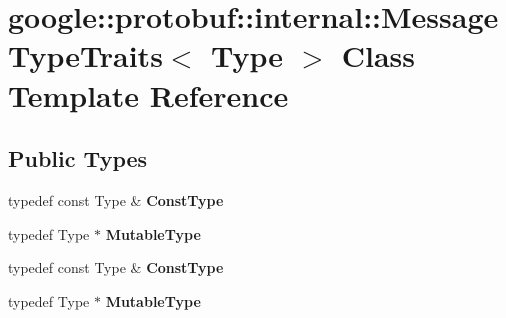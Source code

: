 \hypertarget{classgoogle_1_1protobuf_1_1internal_1_1MessageTypeTraits}{}\section{google\+:\+:protobuf\+:\+:internal\+:\+:Message\+Type\+Traits$<$ Type $>$ Class Template Reference}
\label{classgoogle_1_1protobuf_1_1internal_1_1MessageTypeTraits}
\subsection*{Public Types}
\begin{DoxyCompactItemize}
\item 
\mbox{\label{classgoogle_1_1protobuf_1_1internal_1_1MessageTypeTraits_a2ecc942c5161eafe68f2dbaf28000497}} 
typedef const Type \& {\bfseries Const\+Type}
\item 
\mbox{\label{classgoogle_1_1protobuf_1_1internal_1_1MessageTypeTraits_a55bf11218e663b32635d04bce62904ec}} 
typedef Type $\ast$ {\bfseries Mutable\+Type}
\item 
\mbox{\label{classgoogle_1_1protobuf_1_1internal_1_1MessageTypeTraits_a2ecc942c5161eafe68f2dbaf28000497}} 
typedef const Type \& {\bfseries Const\+Type}
\item 
\mbox{\label{classgoogle_1_1protobuf_1_1internal_1_1MessageTypeTraits_a55bf11218e663b32635d04bce62904ec}} 
typedef Type $\ast$ {\bfseries Mutable\+Type}
\end{DoxyCompactItemize}
